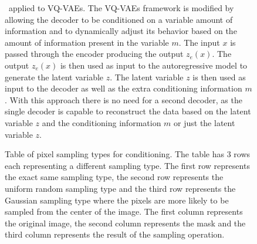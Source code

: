 \begin{figure}[H]
    \centering
    
    \caption[ applied to VQ-VAEs.]%
    {
        \methodTwo\ applied to VQ-VAEs. The VQ-VAEs framework is modified by allowing the decoder to be conditioned on a variable amount of information and to dynamically adjust its behavior based on the amount of information present in the variable $m$. The input $x$ is passed through the encoder producing the output $z_e(x)$. The output $z_e(x)$ is then used as input to the autoregressive model to generate the latent variable $z$. The latent variable $z$ is then used as input to the decoder as well as the extra conditioning information $m$. With this approach there is no need for a second decoder, as the single decoder is capable to reconstruct the data based on the latent variable $z$ and the conditioning information $m$ or just the latent variable $z$.
    }\label{SCVQVAE1DFigure}
\end{figure}


\begin{figure}
    \centering
    
    \caption[Table of pixel sampling types for conditioning.]%
    {
        Table of pixel sampling types for conditioning. The table has 3 rows each representing a different sampling type. The first row represents the exact same sampling type, the second row represents the uniform random sampling type and the third row represents the Gaussian sampling type where the pixels are more likely to be sampled from the center of the image. The first column represents the original image, the second column represents the mask and the third column represents the result of the sampling operation.
    }\label{SamplingFigure}
\end{figure}


